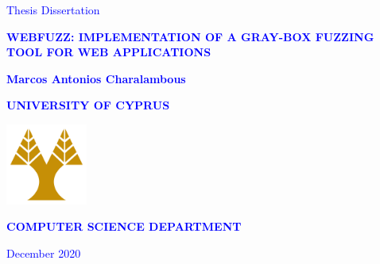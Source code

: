 \documentclass[12pt]{report}
\def\pname{webFuzz\xspace}
\def\ptitle{\pname: Implementation of a Gray-box Fuzzing Tool for Web Applications}
\begin{document}
\begin{titlepage}
\begin{center}
\vspace*{1cm}

\textcolor{blue}{Thesis Dissertation}

\vspace*{2cm}

\textcolor{blue}{\Large{\textbf{\MakeUppercase{\ptitle{}}}}}

\vspace*{2cm}

\textcolor{blue}{\large{\textbf{Marcos Antonios Charalambous}}}

\vspace*{2cm}
\textcolor{blue}{\Large{\textbf{\MakeUppercase{University of Cyprus}}}}

\vspace*{2cm}

\includegraphics[width=0.2\textwidth]{ucy-logo.png}

\vspace*{2cm}

\textcolor{blue}{\Large{\textbf{\MakeUppercase{Computer Science Department}}}}

\vspace*{4cm}

\textcolor{blue}{\normalsize{December 2020}}
\end{center}
\end{titlepage}
\end{document}

